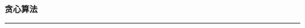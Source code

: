 \documentclass[10pt, a4paper]{article}
\begin{document}
\begin{center}
    \huge\textbf{贪心算法}
\end{center}

\vspace{0.3cm}
\noindent\rule{\linewidth}{0.4pt}
\vspace{0.3cm}

\begin{multicols*}{2}

\end{multicols*}

\vspace{0.5cm}

\begin{multicols*}{2}


\par\columnbreak

\par\columnbreak

\par\columnbreak

\par\columnbreak

\par\columnbreak

\par\columnbreak

\par\columnbreak

\par\columnbreak



\end{multicols*}
\end{document}

